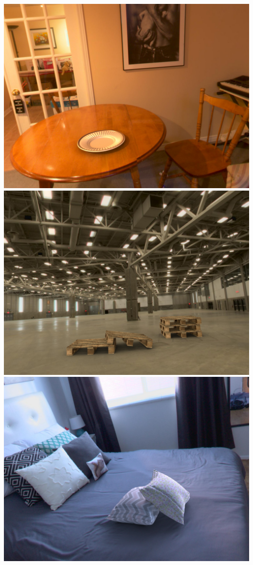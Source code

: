 \begin{multicols}{3}
\includegraphics[width=\linewidth]{virtual_object_insertions/scene0_compose.jpg}\vspace{1em}
\includegraphics[width=\linewidth]{virtual_object_insertions/scene107_compose.jpg}\vspace{1em}
\includegraphics[width=\linewidth]{virtual_object_insertions/scene123_compose.jpg}\vspace{1em}

\end{multicols}
